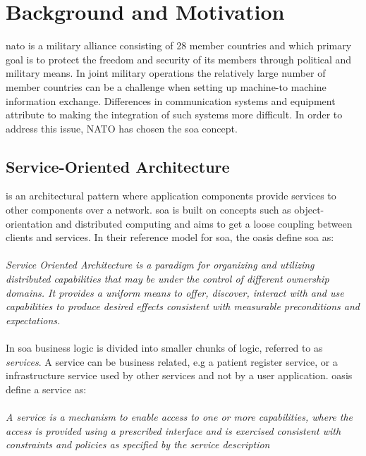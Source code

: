\documentclass[USenglish]{ifimaster}
\begin{document}
\section{Background and Motivation}

\gls{nato} is a military alliance consisting of 28 member
countries\cite{nato-homepage-member-countries} and which primary goal is to
protect the freedom and security of its members through political and military
means. In joint military operations the relatively large number of member
countries can be a challenge when setting up machine-to machine information
exchange. Differences in communication systems and equipment attribute to making
the integration of such systems more difficult. In order to address this issue,
NATO has chosen the \gls{soa} concept\cite{ist-090}.

\subsection{Service-Oriented Architecture}
 is an architectural pattern where application components
provide services to other components over a network. \gls{soa} is built on
concepts such as object-orientation and distributed computing and aims to get
a loose coupling between clients and services. In their reference model for
\gls{soa}\cite{oasis-soa-reference-model}, the \gls{oasis} define \gls{soa} as: \paragraph{}
\textit{Service Oriented Architecture is a paradigm for organizing and utilizing
distributed capabilities that may be under the control of different ownership
domains. It provides a uniform means to offer, discover, interact with and use
capabilities to produce desired effects consistent with measurable preconditions
and expectations.} %

\paragraph{}
 In \gls{soa} business logic is divided into smaller chunks of logic, referred
 to as \textit{services}. A service can be business related, e.g a patient
 register service, or a infrastructure service used by other services and not by
 a user application. \gls{oasis} define a service as:
 \paragraph{}
\textit{
A service is a mechanism to enable access to one or more capabilities, where the
access is  provided using a prescribed interface and is exercised consistent
with constraints and policies as  specified by the service description
}
\end{document}
